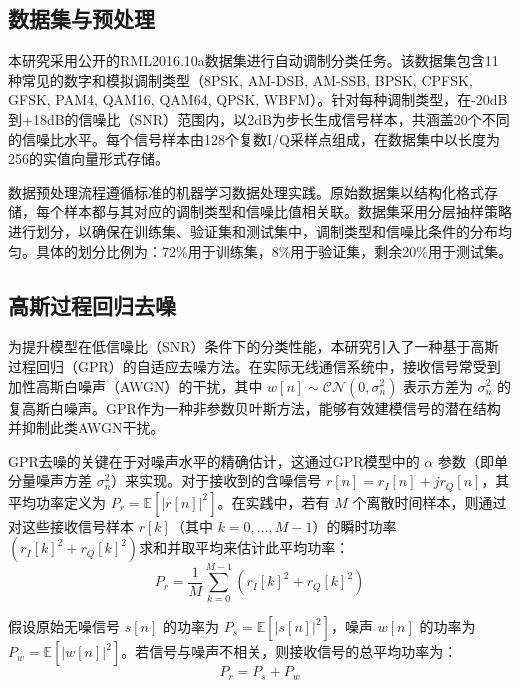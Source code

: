 \documentclass{article}
\begin{document}
\subsection{数据集与预处理}

本研究采用公开的RML2016.10a数据集进行自动调制分类任务。该数据集包含11种常见的数字和模拟调制类型（8PSK, AM-DSB, AM-SSB, BPSK, CPFSK, GFSK, PAM4, QAM16, QAM64, QPSK, WBFM）。针对每种调制类型，在-20dB到+18dB的信噪比（SNR）范围内，以2dB为步长生成信号样本，共涵盖20个不同的信噪比水平。每个信号样本由128个复数I/Q采样点组成，在数据集中以长度为256的实值向量形式存储。

数据预处理流程遵循标准的机器学习数据处理实践。原始数据集以结构化格式存储，每个样本都与其对应的调制类型和信噪比值相关联。数据集采用分层抽样策略进行划分，以确保在训练集、验证集和测试集中，调制类型和信噪比条件的分布均匀。具体的划分比例为：72\%用于训练集，8\%用于验证集，剩余20\%用于测试集。


\subsection{高斯过程回归去噪}

为提升模型在低信噪比（SNR）条件下的分类性能，本研究引入了一种基于高斯过程回归（GPR）的自适应去噪方法。在实际无线通信系统中，接收信号常受到加性高斯白噪声（AWGN）的干扰，其中 $w[n] \sim \mathcal{CN}(0, \sigma_n^2)$ 表示方差为 $\sigma_n^2$ 的复高斯白噪声。GPR作为一种非参数贝叶斯方法，能够有效建模信号的潜在结构并抑制此类AWGN干扰。

GPR去噪的关键在于对噪声水平的精确估计，这通过GPR模型中的 $\alpha$ 参数（即单分量噪声方差 $\sigma_n^2$）来实现。对于接收到的含噪信号 $r[n]=r_I[n]+jr_Q[n]$，其平均功率定义为 $P_r = \mathbb{E}[|r[n]|^2]$。在实践中，若有 $M$ 个离散时间样本，则通过对这些接收信号样本 $r[k]$（其中 $k=0, \ldots, M-1$）的瞬时功率 $(r_I[k]^2 + r_Q[k]^2)$求和并取平均来估计此平均功率：
\begin{equation}
P_r = \frac{1}{M}\sum_{k=0}^{M-1}(r_I[k]^2+r_Q[k]^2)
\end{equation}

假设原始无噪信号 $s[n]$ 的功率为 $P_s = \mathbb{E}[|s[n]|^2]$，噪声 $w[n]$ 的功率为 $P_w = \mathbb{E}[|w[n]|^2]$。若信号与噪声不相关，则接收信号的总平均功率为：
\begin{equation}
P_r = P_s + P_w
\end{equation}
\end{document}
